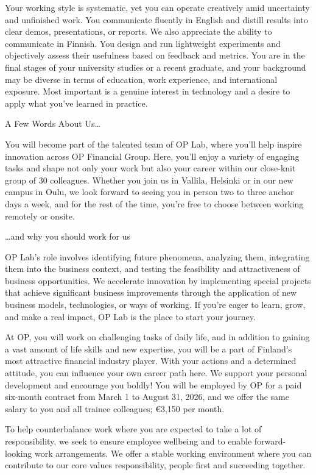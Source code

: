 \documentclass[a4paper,11pt]{article}
\begin{document}
Your working style is systematic, yet you can operate creatively amid uncertainty and unfinished work. You communicate fluently in English and distill results into clear demos, presentations, or reports. We also appreciate the ability to communicate in Finnish. You design and run lightweight experiments and objectively assess their usefulness based on feedback and metrics. You are in the final stages of your university studies or a recent graduate, and your background may be diverse in terms of education, work experience, and international exposure. Most important is a genuine interest in technology and a desire to apply what you've learned in practice.

A Few Words About Us…

You will become part of the talented team of OP Lab, where you'll help inspire innovation across OP Financial Group. Here, you'll enjoy a variety of engaging tasks and shape not only your work but also your career within our close-knit group of 30 colleagues. Whether you join us in Vallila, Helsinki or in our new campus in Oulu, we look forward to seeing you in person two to three anchor days a week, and for the rest of the time, you're free to choose between working remotely or onsite.

…and why you should work for us

OP Lab's role involves identifying future phenomena, analyzing them, integrating them into the business context, and testing the feasibility and attractiveness of business opportunities. We accelerate innovation by implementing special projects that achieve significant business improvements through the application of new business models, technologies, or ways of working. If you're eager to learn, grow, and make a real impact, OP Lab is the place to start your journey.

At OP, you will work on challenging tasks of daily life, and in addition to gaining a vast amount of life skills and new expertise, you will be a part of Finland's most attractive financial industry player. With your actions and a determined attitude, you can influence your own career path here. We support your personal development and encourage you boldly! You will be employed by OP for a paid six-month contract from March 1 to August 31, 2026, and we offer the same salary to you and all trainee colleagues; €3,150 per month.

To help counterbalance work where you are expected to take a lot of responsibility, we seek to ensure employee wellbeing and to enable forward-looking work arrangements. We offer a stable working environment where you can contribute to our core values responsibility, people first and succeeding together.
\end{document}
